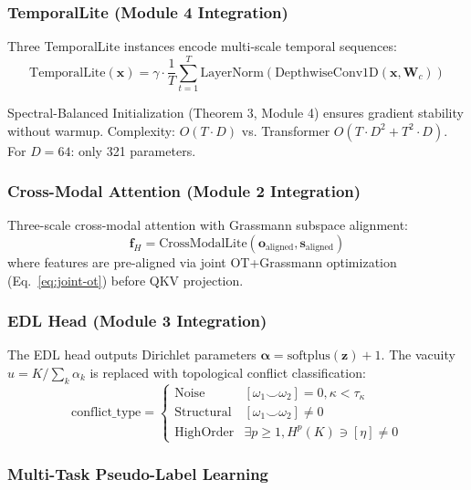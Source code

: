 \subsubsection{TemporalLite (Module 4 Integration)}

Three TemporalLite instances encode multi-scale temporal sequences:
\begin{equation}
    \text{TemporalLite}(\mathbf{x}) = \gamma \cdot \frac{1}{T}\sum_{t=1}^T
    \text{LayerNorm}(\text{DepthwiseConv1D}(\mathbf{x}, \mathbf{W}_c))
\end{equation}

Spectral-Balanced Initialization (Theorem 3, Module 4) ensures gradient
stability without warmup. Complexity: $O(T \cdot D)$ vs. Transformer
$O(T \cdot D^2 + T^2 \cdot D)$. For $D=64$: only 321 parameters.

\subsubsection{Cross-Modal Attention (Module 2 Integration)}

Three-scale cross-modal attention with Grassmann subspace alignment:
\begin{equation}
    \mathbf{f}_H = \text{CrossModalLite}(\mathbf{o}_{\text{aligned}}, \mathbf{s}_{\text{aligned}})
\end{equation}
where features are pre-aligned via joint OT+Grassmann optimization
(Eq.~\eqref{eq:joint-ot}) before QKV projection.

\subsubsection{EDL Head (Module 3 Integration)}

The EDL head outputs Dirichlet parameters $\boldsymbol{\alpha} = \text{softplus}(\mathbf{z}) + 1$.
The vacuity $u = K / \sum_k \alpha_k$ is replaced with topological conflict
classification:
\begin{equation}
    \text{conflict\_type} = \begin{cases}
        \text{Noise} & [\omega_1 \smile \omega_2] = 0, \kappa < \tau_\kappa \\
        \text{Structural} & [\omega_1 \smile \omega_2] \neq 0 \\
        \text{HighOrder} & \exists p \geq 1, H^p(K) \ni [\eta] \neq 0
    \end{cases}
\end{equation}

\subsubsection{Multi-Task Pseudo-Label Learning}

